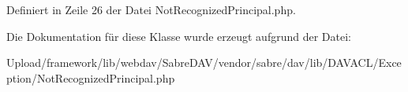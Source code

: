 Definiert in Zeile 26 der Datei Not\+Recognized\+Principal.\+php.



Die Dokumentation für diese Klasse wurde erzeugt aufgrund der Datei\+:\begin{DoxyCompactItemize}
\item 
Upload/framework/lib/webdav/\+Sabre\+D\+A\+V/vendor/sabre/dav/lib/\+D\+A\+V\+A\+C\+L/\+Exception/Not\+Recognized\+Principal.\+php\end{DoxyCompactItemize}
